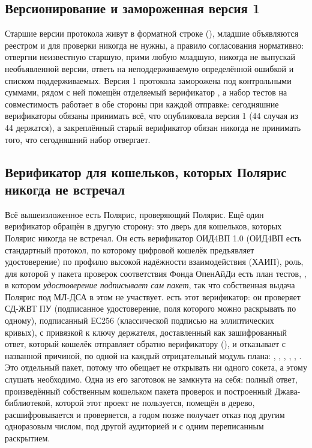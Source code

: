 \subsection{Версионирование и замороженная версия 1}

Старшие версии протокола живут в форматной строке (), младшие
объявляются реестром и для проверки никогда не нужны, а правило согласования нормативно: отвергни
неизвестную старшую, прими любую младшую, никогда не выпускай необъявленной версии, ответь на
неподдерживаемую определённой ошибкой и списком поддерживаемых. Версия 1 протокола заморожена под
контрольными суммами, рядом с ней помещён отделяемый верификатор , а набор тестов на
совместимость работает в обе стороны при каждой отправке: сегодняшние верификаторы обязаны
принимать всё, что опубликовала версия 1 (44 случая из 44 держатся), а закреплённый старый
верификатор обязан никогда не принимать того, что сегодняшний набор отвергает. \sImpl

\subsection{Верификатор для кошельков, которых Полярис никогда не встречал}

Всё вышеизложенное есть Полярис, проверяющий Полярис. Ещё один верификатор обращён в другую
сторону: это дверь для кошельков, которых Полярис никогда не встречал. Он есть верификатор ОИД4ВП 1.0
(ОИД4ВП есть стандартный протокол, по которому цифровой кошелёк предъявляет удостоверение) по профилю
высокой надёжности взаимодействия (ХАИП), роль, для которой у пакета проверок соответствия Фонда
ОпенАйДи есть план тестов, , в котором \emph{удостоверение
подписывает сам пакет}, так что собственная выдача Полярис под МЛ-ДСА в этом не участвует.
 есть этот верификатор: он проверяет СД-ЖВТ ПУ (подписанное удостоверение, поля которого можно раскрывать по одному),
подписанный ЕС256 (классической подписью на эллиптических кривых), с
привязкой к ключу держателя, доставленный как зашифрованный ответ, который кошелёк отправляет обратно верификатору
(), и
отказывает с названной причиной, по одной на каждый отрицательный модуль плана:
, , , , ,
. Это отдельный пакет, потому что  обещает не открывать
ни одного сокета, а этому слушать необходимо. Одна из его заготовок не замкнута на себя: полный
ответ, произведённый собственным кошельком пакета проверок и построенный Джава-библиотекой, которой
этот проект не пользуется, помещён в дерево, расшифровывается и проверяется, а годом позже
получает отказ под другим одноразовым числом, под другой аудиторией и с одним переписанным
раскрытием. \sImpl

